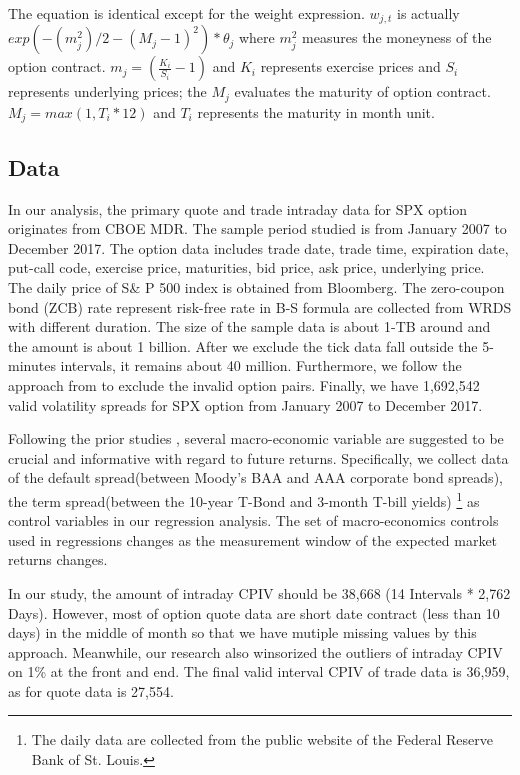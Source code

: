 \begin{enumerate}
The equation is identical except for the weight expression. $w_{j,t}$ is actually $exp(-(m_{j}^{2})/2 -(M_{j} - 1)^{2}) * \theta_{j}$ where $m_{j}^{2}$ measures the moneyness of the option contract.  $m_{j} =  (\frac{K_{i}}{S_{i}} - 1)$ and $K_{i}$ represents exercise prices and $S_{i}$ represents underlying prices; the $M_{j}$ evaluates the maturity of option contract. $M_{j} =  max(1, T_{i}*12) $ and $T_{i}$ represents the maturity in month unit. 


\end{enumerate}


\subsection{Data}
In our analysis, the primary quote and trade intraday data for SPX option originates from CBOE MDR. The sample period studied is from January 2007 to December 2017. The option data includes trade date, trade time, expiration date, put-call code, exercise price, maturities, bid price, ask price, underlying price. The daily price of S\& P 500 index is obtained from Bloomberg. The zero-coupon bond (ZCB) rate represent risk-free rate in B-S formula are collected from WRDS with different duration. The size of the sample data is about 1-TB around and the amount is about 1 billion. After we exclude the tick data fall outside the 5-minutes intervals, it remains about 40 million. Furthermore, we follow the approach from \textcite{ofek2004limited} to exclude the invalid option pairs. Finally, we have 1,692,542 valid volatility spreads for SPX option from January 2007 to December 2017. 


Following the prior studies \textcite{bollerslev2009expected}, several macro-economic variable are suggested to be crucial and informative with regard to future returns. Specifically, we collect data of the default spread(between Moody's BAA and AAA corporate bond spreads), the term spread(between the 10-year T-Bond and 3-month T-bill yields) \footnote{The daily data are collected from the public website of the Federal Reserve Bank of St. Louis.} as control variables in our regression analysis. The set of macro-economics controls used in regressions changes as the measurement window of the expected market returns changes. 


In our study, the amount of intraday CPIV should be 38,668 (14 Intervals * 2,762 Days). However, most of option quote data are short date contract (less than 10 days) in the middle of month so that we have mutiple missing values by this approach. Meanwhile, our research also winsorized the outliers of intraday CPIV on 1\% at the front and end. The final valid interval CPIV of trade data is 36,959, as for quote data is 27,554.


